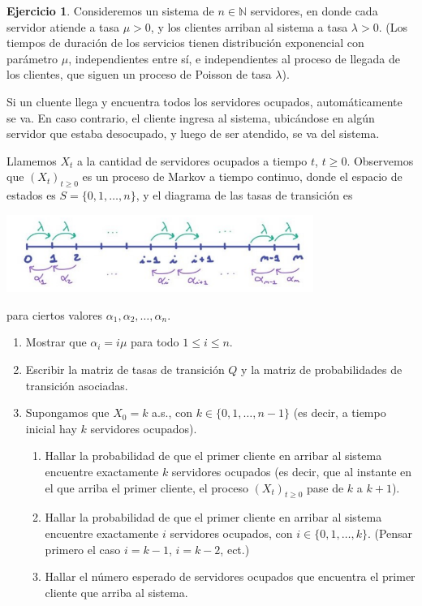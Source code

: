 \documentclass{article}
\newcommand{\naturalnum}{\mathbb{N}}
\theoremstyle{definition}
\newtheorem{exercise}{Ejercicio}
\begin{document}
\begingroup
\newpage
\newcommand{\markovProcess}{(X_t)_{t \geq 0}}
\newcommand{\stateSpace}{S}

\begin{exercise}
Consideremos un sistema de $n \in \naturalnum$ servidores, en donde cada servidor atiende a tasa $\mu > 0$, y los clientes arriban al sistema a tasa $\lambda > 0$.
(Los tiempos de duración de los servicios tienen distribución exponencial con parámetro $\mu$, independientes entre sí, e independientes al proceso de llegada de los clientes, que siguen un proceso de Poisson de tasa $\lambda$).

Si un cluente llega y encuentra todos los servidores ocupados, automáticamente se va.
En caso contrario, el cliente ingresa al sistema, ubicándose en algún servidor que estaba desocupado, y luego de ser atendido, se va del sistema.

Llamemos $X_t$ a la cantidad de servidores ocupados a tiempo $t$, $t \geq 0$.
Observemos que $\markovProcess$ es un proceso de Markov a tiempo continuo, donde el espacio de estados es $\stateSpace = \{0, 1, \dots, n\}$, y el diagrama de las tasas de transición es
\begin{center}
\includegraphics[width=0.75\textwidth]{diagrama_de_las_tasas_de_transicion}
\end{center}
para ciertos valores $\alpha_1, \alpha_2, \dots, \alpha_n$.
\begin{enumerate}
	\item Mostrar que \(\alpha_i = i \mu\) para todo \(1 \leq i \leq n\).
	\item Escribir la matriz de tasas de transición \(Q\) y la matriz de probabilidades de transición asociadas.
	\item Supongamos que \(X_0 = k\) a.s., con \(k \in \{0, 1, \dots, n - 1\}\) (es decir, a tiempo inicial hay \(k\) servidores ocupados).
	\begin{enumerate}[label= \roman*.]
		\item Hallar la probabilidad de que el primer cliente en arribar al sistema encuentre exactamente $k$ servidores ocupados (es decir, que al instante en el que arriba el primer cliente, el proceso $\markovProcess$ pase de $k$ a $k + 1$).
		\item Hallar la probabilidad de que el primer cliente en arribar al sistema encuentre exactamente $i$ servidores ocupados, con $i \in \{0, 1, \dots, k\}$.
		(Pensar primero el caso $i = k - 1$, $i = k - 2$, ect.)
		\item Hallar el número esperado de servidores ocupados que encuentra el primer cliente que arriba al sistema.
	\end{enumerate}
\end{enumerate}
\end{exercise}
\end{document}
